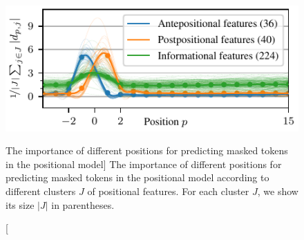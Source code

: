 \begin{figure}
\centering
\includegraphics[width=0.7\columnwidth]{positional-features}
\vspace{-0.2cm}
\caption
  [The importance of different positions for predicting masked tokens in
   the positional model]%
  {The importance of different positions for predicting masked tokens in
   the positional model according to different clusters $J$ of positional
   features. For each cluster $J$, we show its size $|J|$ in parentheses.
   \cite[Figure 4]{novotny2021when}}
\label{fig:position-independent-token-embeddings-interpretability}
\end{figure}

